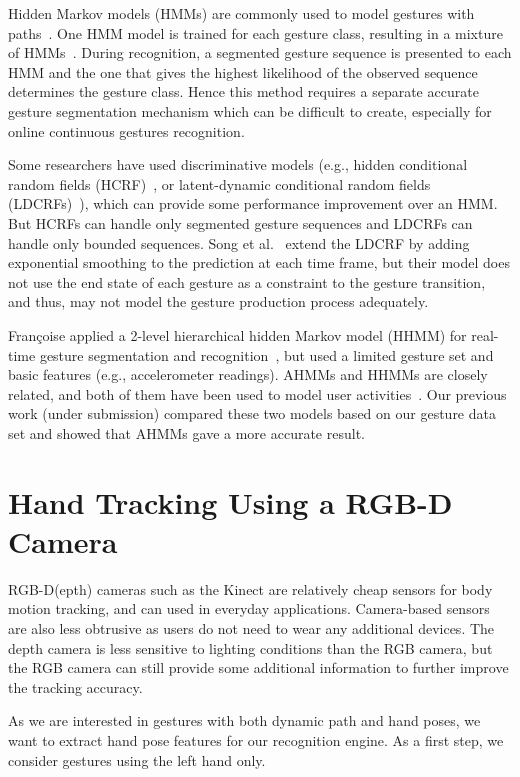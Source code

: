 \documentclass{acm_proc_article-sp}
\begin{document}
Hidden Markov models (HMMs) are commonly used
to model gestures with paths~\cite{sharma00, Starner95}. 
One HMM model is trained for each gesture class, resulting in a mixture of HMMs~\cite{yin10}. During
recognition, a segmented gesture sequence is presented to each HMM and the one that gives the highest
likelihood of the observed sequence determines the gesture class. Hence this method requires
a separate accurate gesture segmentation mechanism which can be difficult to create, especially for online continuous gestures
recognition.

Some researchers have used discriminative models (e.g., hidden conditional 
random fields (HCRF)~\cite{wang06}, or latent-dynamic conditional random fields (LDCRFs)~\cite{morency07}), which can provide some 
performance improvement over an HMM. But HCRFs
can handle only segmented gesture sequences and LDCRFs can handle only bounded sequences. Song et al.~\cite{song12} extend the LDCRF by 
adding exponential smoothing to the prediction at each time frame, but their model does not
use the end state of each gesture as a constraint to the gesture transition, and thus, may not
model the gesture production process adequately.  

Fran\c coise applied a 2-level hierarchical hidden Markov model (HHMM) for real-time 
gesture segmentation and recognition~\cite{francoise10}, but used a limited gesture set and basic features (e.g., accelerometer readings).
AHMMs and HHMMs are closely related, and both of them have been used to model user activities~\cite{nguyen03, nguyen05}. Our
previous work (under submission) compared these two models based on our gesture data set and showed that AHMMs gave a more accurate result.

\section{Hand Tracking Using a RGB-D Camera}\label{sec:tracking}
RGB-D(epth) cameras such as the Kinect are relatively cheap sensors for 
body motion tracking, and can used in everyday applications. Camera-based
sensors are also less obtrusive as users do not need to wear any additional
devices. The depth camera is less sensitive to lighting conditions than the RGB
camera, but the RGB camera can still provide some additional information to
further improve the tracking accuracy.

As we are interested in gestures with both dynamic path and hand poses, we want
to extract hand pose features for our recognition engine. As a first step, we
consider gestures using the left hand only.
\end{document}
